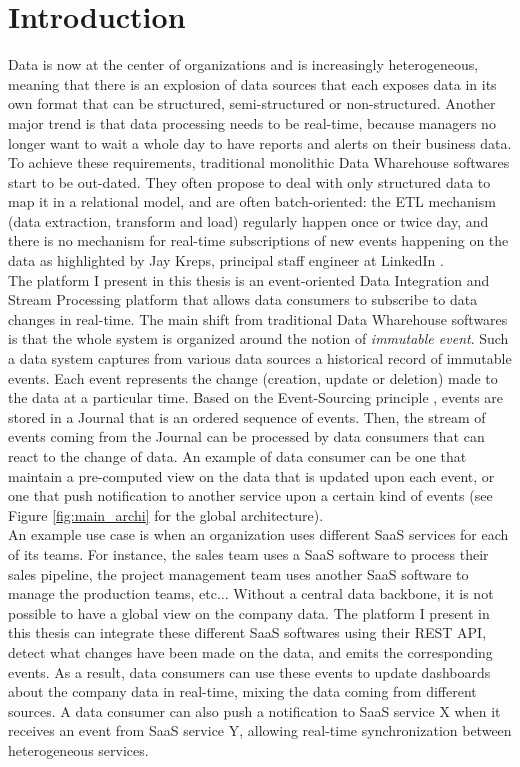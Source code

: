 \chapter{Introduction}

Data is now at the center of organizations and is increasingly heterogeneous, meaning that there is an explosion of data sources 
that each exposes data in its own format that can be structured, semi-structured or non-structured.
Another major trend is that data processing needs to be real-time, because managers no longer want to wait a whole day 
to have reports and alerts on their business data.
\\

To achieve these requirements, traditional monolithic Data Wharehouse softwares start to be out-dated. They often
propose to deal with only structured data to map it in a relational model, and are often batch-oriented: 
the ETL mechanism (data extraction, transform and load) regularly happen once or twice day, and there is no mechanism 
for real-time subscriptions of new events happening on the data as highlighted by Jay Kreps, principal staff engineer at LinkedIn .
\\

The platform I present in this thesis is an event-oriented Data Integration and Stream Processing platform that allows data consumers
to subscribe to data changes in real-time. The main shift from traditional Data Wharehouse softwares is that the whole
system is organized around the notion of \textit{immutable event}. Such a data system captures from various data sources
a historical record of immutable events. Each event represents the change (creation, update or deletion) made to the data at a particular time. 
Based on the Event-Sourcing principle , events are stored in a Journal that is an ordered sequence of 
events. Then, the stream of events coming from the Journal can be processed by data consumers that can react to the change of data. 
An example of data consumer can be one that maintain a pre-computed view on the data that is updated upon each event, or one that push 
notification to another service upon a certain kind of events (see Figure \ref{fig:main_archi} for the global architecture).
\\

An example use case is when an organization uses different SaaS services for each of its teams. For instance, the sales
team uses a SaaS software to process their sales pipeline, the project management team uses another SaaS software to manage
the production teams, etc... Without a central data backbone, it is not possible to have a global view on the company data.
The platform I present in this thesis can integrate these different SaaS softwares using their REST API, detect what
changes have been made on the data, and emits the corresponding events. As a result, data consumers can use these events
to update dashboards about the company data in real-time, mixing the data coming from different sources. A data consumer can also push a
notification to SaaS service X when it receives an event from SaaS service Y, allowing real-time synchronization between
heterogeneous services.
\\

